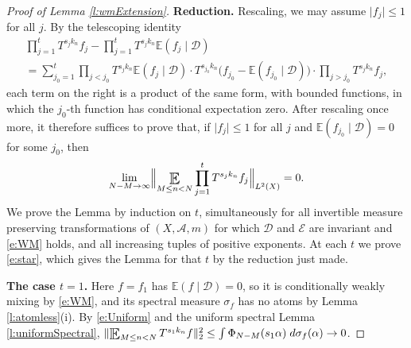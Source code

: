 \begin{proof}[Proof of Lemma \ref{l:wmExtension}]

\noindent\textbf{Reduction.}
Rescaling, we may assume $\lvert f_j\rvert \leq 1$ for all $j$.  By the telescoping identity
\begin{multline}
\prod _{j=1}^t T^{s_jk_n}f_j - \prod _{j=1}^t T^{s_jk_n}\mathbb{E} (f_j \mid \mathcal D) \\
= \sum _{j_0=1}^t \prod _{j<j_0} T ^{s_jk_n} \mathbb E(f_j\mid \mathcal D) \cdot T ^{s_{j_0}k_n} \bigl( f_{j_0} - \mathbb E(f_{j_0}\mid \mathcal D)\bigr) \cdot \prod _{j>j_0} T ^{s_jk_n}f_j ,
\end{multline}
each term on the right is a product of the same form, with bounded functions, in which the $j_0$-th function has conditional expectation zero.
After rescaling once more, it therefore suffices to prove that, if $\lvert f_j\rvert \leq 1$ for all $j$ and $\mathbb E (f_{j_0}\mid \mathcal D)=0$ for some $j_0$, then 
\begin{equation} \label{e:star}
\lim_{N-M\to\infty} \Bigl\lVert \Expectation_{M\leq n<N} \prod_{j=1}^t T ^{s_jk_n}f_j \Bigr\rVert _{L^2(X)} = 0 . 
\end{equation}
We prove the Lemma by induction on $t$, simultaneously for all invertible measure preserving transformations of $(X,\mathcal A,m)$ for which $\mathcal D$ and $\mathcal E$ are invariant and \eqref{e:WM} holds,
and all increasing tuples of positive exponents.  At each $t$ we prove \eqref{e:star}, which gives the Lemma for that $t$ by the reduction just made.

\medskip
\noindent\textbf{The case $t=1$.}
Here $f = f_1$ has $\mathbb E(f\mid \mathcal D)=0$, so it is conditionally weakly mixing by \eqref{e:WM}, and its spectral measure $\sigma _f$ has no atoms by Lemma \ref{l:atomless}(i).
By \eqref{e:Uniform} and the uniform spectral Lemma \ref{l:uniformSpectral},
$\lVert \Expectation_{M\leq n<N} T ^{s_1k_n}f\rVert _2 ^2 \leq \int \Phi _{N-M}(s_1 \alpha )\;d \sigma _f ( \alpha ) \to 0$.


\end{proof}
